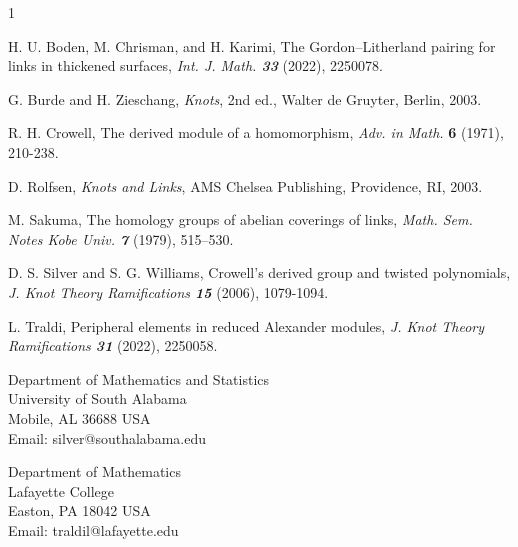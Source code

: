 \documentclass[11pt]{article}
\numberwithin{equation}{section}
\theoremstyle{definition}
\def\ni{\noindent}
\begin{document}
\begin{thebibliography}{1}


 H. U. Boden, M. Chrisman, and H. Karimi, The Gordon–Litherland pairing for links in thickened surfaces, {\sl Int. J. Math. {\bf 33}} (2022), 2250078.

 G. Burde and H. Zieschang, {\sl Knots}, 2nd ed., Walter de Gruyter, Berlin, 2003.


 R. H. Crowell, The derived module of a homomorphism, \emph{Adv. in Math.} \textbf{6} (1971), 210-238.

 D. Rolfsen, {\sl Knots and Links}, AMS Chelsea Publishing, Providence, RI, 2003. 

 M. Sakuma, The homology groups of abelian coverings of links, {\sl Math. Sem. Notes Kobe Univ. \bf 7}  (1979), 515--530.


 D. S. Silver and S. G. Williams, Crowell's derived group and twisted polynomials, {\sl J. Knot Theory Ramifications {\bf 15}} (2006), 1079-1094.


 L. Traldi, Peripheral elements in reduced Alexander modules,  {\sl J. Knot Theory Ramifications \bf 31} (2022), 2250058.


\end{thebibliography}



\ni Department of Mathematics and Statistics\\
\ni University of South Alabama\\ Mobile, AL 36688 USA\\
\ni Email: silver@southalabama.edu
\bigskip

\ni Department of Mathematics\\
\ni Lafayette College\\Easton, PA 18042 USA\\
\ni Email: traldil@lafayette.edu\\ 
\end{document}
